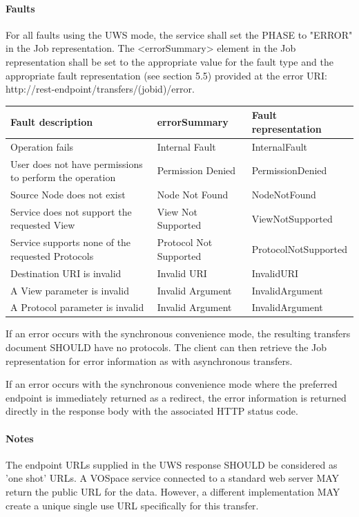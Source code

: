 \documentclass[11pt,a4paper]{ivoa}
\begin{document}
\paragraph{Faults}
For all faults using the UWS mode, the service shall set the PHASE to "ERROR" in the Job representation. The <errorSummary> element in the Job representation shall be set to the appropriate value for the fault type and the appropriate fault representation (see section 5.5) provided at the error URI: http://rest-endpoint/transfers/(jobid)/error.

\vspace{3mm}
\begin{tabular}{ p{5cm} l p{4cm} }
\textbf{Fault description} & \textbf{errorSummary} & \textbf{Fault representation} \\
\hline
Operation fails & Internal Fault & InternalFault \\
\hline
User does not have permissions to perform the operation	 & Permission Denied & PermissionDenied \\
\hline
Source Node does not exist & Node Not Found & NodeNotFound \\
\hline
Service does not support the requested View & View Not Supported & ViewNotSupported \\
\hline
Service supports none of the requested Protocols & Protocol Not Supported &ProtocolNotSupported \\
\hline
Destination URI is invalid & Invalid URI & InvalidURI \\
\hline
A View parameter is invalid & Invalid Argument & InvalidArgument \\
\hline
A Protocol parameter is invalid & Invalid Argument & InvalidArgument \\
\hline
\end{tabular}
\vspace{3mm}

If an error occurs with the synchronous convenience mode, the resulting transfers document SHOULD have no protocols. The client can then retrieve the Job representation for error information as with asynchronous transfers.

If an error occurs with the synchronous convenience mode where the preferred endpoint is immediately returned as a redirect, the error information is returned directly in the response body with the associated HTTP status code.

\paragraph{Notes}
The endpoint URLs supplied in the UWS response SHOULD be considered as 'one shot' URLs. A VOSpace service connected to a standard web server MAY return the public URL for the data. However, a different implementation MAY create a unique single use URL specifically for this transfer.
\end{document}
